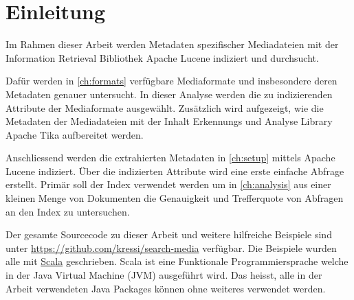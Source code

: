 \begin{comment}
\paragraph{Ausgangslage} \hfill \\
Auf einem privaten Network Attached Storage (NAS) sind mehrere Hundert Video und mehrere Tausend Musikdateien abgelegt. Diese sind in groben Ordnerstrukturen organisiert. Clientseitig existiert eine Suche, mit welcher die Dateinamen durchsucht werden können. Da die meisten dieser Dateien mit Metadaten versehen ist es wünschenswert auch diese Daten durchsuchen zu können.

\paragraph{Ziel der Arbeit} \hfill \\
Im Rahmen dieser Arbeit sollen die Metadaten der Dateien einer Media Library auf einem Network Attached Storage indiziert werden. Auf dem erstellten Index sollen Suchabfragen ausgeführt werden können.
\end{comment}


\chapter{Einleitung}
Im Rahmen dieser Arbeit werden Metadaten spezifischer Mediadateien
mit der Information Retrieval Bibliothek Apache Lucene 
\cite{web:lucene} indiziert und durchsucht.

Dafür werden in \cref{ch:formats} verfügbare Mediaformate und 
insbesondere deren
Metadaten genauer untersucht. In dieser Analyse werden
die zu indizierenden Attribute der Mediaformate ausgewählt.
Zusätzlich wird aufgezeigt, wie die Metadaten der Mediadateien
mit der Inhalt Erkennungs und Analyse Library Apache Tika
\cite{web:tika} aufbereitet werden.

Anschliessend werden die extrahierten Metadaten in \cref{ch:setup}
mittels Apache Lucene indiziert. Über die indizierten Attribute
wird eine erste einfache Abfrage erstellt. Primär soll der Index
verwendet werden um in \cref{ch:analysis} aus einer kleinen Menge von Dokumenten die Genauigkeit und Trefferquote von Abfragen an
den Index zu untersuchen.

Der gesamte Sourcecode zu dieser Arbeit und weitere hilfreiche
Beispiele sind unter \url{https://github.com/kressi/search-media}
verfügbar. Die Beispiele wurden alle mit
\href{http://www.scala-lang.org/documentation/}{Scala} geschrieben.
Scala ist eine Funktionale Programmiersprache welche in 
der Java Virtual Machine (JVM) ausgeführt wird. Das heisst,
alle in der Arbeit verwendeten Java Packages können ohne
weiteres verwendet werden.

